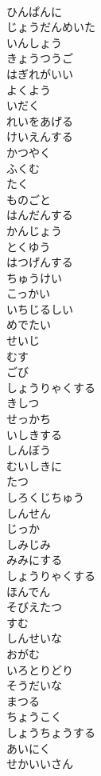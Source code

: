 \documentclass[8pt]{extreport}
\begin{document}
\begin{CJK}{UTF8}{min}
\\	ひんぱんに
\\	じょうだんめいた
\\	いんしょう
\\	きょうつうご
\\	はぎれがいい
\\	よくよう
\\	いだく
\\	れいをあげる
\\	けいえんする
\\	かつやく
\\	ふくむ
\\	たく
\\	ものごと
\\	はんだんする
\\	かんじょう
\\	とくゆう
\\	はつげんする
\\	ちゅうけい
\\	こっかい
\\	いちじるしい
\\	めでたい
\\	せいじ
\\	むす
\\	ごび
\\	しょうりゃくする
\\	きしつ
\\	せっかち
\\	いしきする
\\	しんぼう
\\	むいしきに
\\	たつ
\\	しろくじちゅう
\\	しんせん
\\	じっか
\\	しみじみ
\\	みみにする
\\	しょうりゃくする
\\	ほんでん
\\	そびえたつ
\\	すむ
\\	しんせいな
\\	おがむ
\\	いろとりどり
\\	そうだいな
\\	まつる
\\	ちょうこく
\\	しょうちょうする
\\	あいにく
\\	せかいいさん

\end{CJK}
\end{document}
